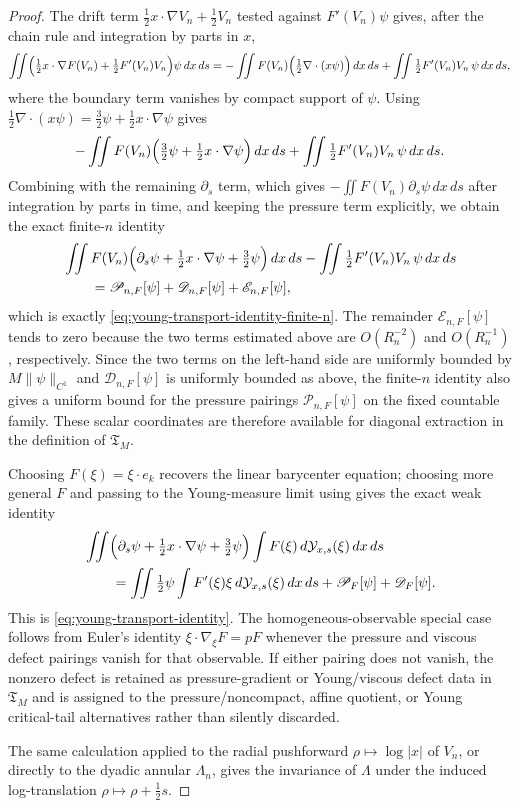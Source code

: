 \documentclass[11pt]{amsart}
\numberwithin{equation}{section}
\theoremstyle{plain}
\theoremstyle{definition}
\theoremstyle{remark}
\newcommand{\Tcrit}{\mathfrak T_M}
\begin{document}
\begin{proof}
The drift term \(\tfrac12 x\cdot\nabla V_n+\tfrac12 V_n\) tested against
\(F'(V_n)\psi\) gives, after the chain rule and integration by parts in
\(x\),
\[
   \iint\Bigl(\tfrac12 x\cdot\nabla F(V_n)+\tfrac12 F'(V_n)V_n\Bigr)\psi\,dx\,ds
   =-\iint F(V_n)\Bigl(\tfrac12\nabla\cdot(x\psi)\Bigr)\,dx\,ds
   +\iint \tfrac12 F'(V_n)V_n\,\psi\,dx\,ds ,
\]
where the boundary term vanishes by compact support of \(\psi\).  Using
\(\tfrac12\nabla\cdot(x\psi)=\tfrac32\psi+\tfrac12 x\cdot\nabla\psi\) gives
\[
   -\iint F(V_n)
   \Bigl(\tfrac32\psi+\tfrac12 x\cdot\nabla\psi\Bigr)\,dx\,ds
   +\iint \tfrac12 F'(V_n)V_n\,\psi\,dx\,ds .
\]
Combining with the remaining \(\partial_s\) term, which gives
\(-\iint F(V_n)\partial_s\psi\,dx\,ds\) after integration by parts in time,
and keeping the pressure term explicitly, we obtain the exact finite-\(n\)
identity
\[
\begin{aligned}
   &\iint
   F(V_n)
   \Bigl(\partial_s\psi+\tfrac12 x\cdot\nabla\psi+\tfrac32\psi\Bigr)\,dx\,ds
   -\iint \tfrac12 F'(V_n)V_n\,\psi\,dx\,ds \\
   &\qquad =
   \mathscr P_{n,F}[\psi]+\mathscr D_{n,F}[\psi]+\mathscr E_{n,F}[\psi],
\end{aligned}
\]
which is exactly \eqref{eq:young-transport-identity-finite-n}.  The remainder
\(\mathscr E_{n,F}[\psi]\) tends to zero because the two terms estimated above
are \(O(R_n^{-2})\) and \(O(R_n^{-1})\), respectively.  Since the two terms on
the left-hand side are uniformly bounded by \(M\|\psi\|_{C^1}\) and
\(\mathscr D_{n,F}[\psi]\) is uniformly bounded as above, the finite-\(n\)
identity also gives a uniform bound for the pressure pairings
\(\mathscr P_{n,F}[\psi]\) on the fixed countable family.  These scalar
coordinates are therefore available for diagonal extraction in the definition of
\(\Tcrit\).

Choosing \(F(\xi)=\xi\cdot e_k\) recovers the linear barycenter equation;
choosing more general \(F\) and passing to the Young-measure limit using
 gives the exact weak identity
\[
\begin{aligned}
   &\iint
   \Bigl(\partial_s\psi+\tfrac12 x\cdot\nabla\psi+\tfrac32\psi\Bigr)
   \int F(\xi)\,d\mathcal Y_{x,s}(\xi)\,dx\,ds\\
   &\qquad =
   \iint \tfrac12 \psi
   \int F'(\xi)\xi\,d\mathcal Y_{x,s}(\xi)\,dx\,ds
   +\mathscr P_F[\psi]+\mathscr D_F[\psi].
\end{aligned}
\]
This is \eqref{eq:young-transport-identity}.  The homogeneous-observable
special case follows from Euler's identity
\(\xi\cdot\nabla_\xi F=pF\) whenever the pressure and viscous defect pairings
vanish for that observable.  If either pairing does not vanish, the nonzero
defect is retained as pressure-gradient or Young/viscous defect data in
\(\Tcrit\) and is assigned to the pressure/noncompact, affine quotient, or
Young critical-tail alternatives rather than silently discarded.

The same calculation applied to the radial pushforward
\(\rho\mapsto\log|x|\) of \(V_n\), or directly to the dyadic annular
\(\Lambda_n\), gives the invariance of \(\Lambda\) under the induced
log-translation \(\rho\mapsto\rho+\tfrac12 s\).
\end{proof}
\end{document}
